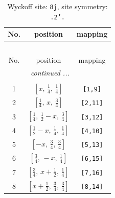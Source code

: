 \documentclass[fleqn,8pt]{jsarticle}
\begin{document}
\begin{longtable}{ccc}
\caption{Wyckoff site: {\tt 8j}, site symmetry: {\tt .2'.}}
 \\
 \hline \hline
No. & position & mapping \\ \hline \endfirsthead

\multicolumn{2}{l}{\tablename\ \thetable{}} \\
 \hline \hline
No. & position & mapping \\ \hline \endhead

 \hline \hline
\multicolumn{2}{r}{\footnotesize\it continued ...} \\ \endfoot

 \hline \hline
\multicolumn{2}{r}{} \\ \endlastfoot

1 & $\left[ x,\, \frac{1}{4},\, \frac{1}{4} \right]$ & {\tt [1,9]} \\ \hline
2 & $\left[ \frac{1}{4},\, x,\, \frac{3}{4} \right]$ & {\tt [2,11]} \\ \hline
3 & $\left[ \frac{1}{4},\, \frac{1}{2} - x,\, \frac{3}{4} \right]$ & {\tt [3,12]} \\ \hline
4 & $\left[ \frac{1}{2} - x,\, \frac{1}{4},\, \frac{1}{4} \right]$ & {\tt [4,10]} \\ \hline
5 & $\left[ - x,\, \frac{3}{4},\, \frac{3}{4} \right]$ & {\tt [5,13]} \\ \hline
6 & $\left[ \frac{3}{4},\, - x,\, \frac{1}{4} \right]$ & {\tt [6,15]} \\ \hline
7 & $\left[ \frac{3}{4},\, x + \frac{1}{2},\, \frac{1}{4} \right]$ & {\tt [7,16]} \\ \hline
8 & $\left[ x + \frac{1}{2},\, \frac{3}{4},\, \frac{3}{4} \right]$ & {\tt [8,14]} \\
\end{longtable}
\renewcommand{\arraystretch}{1.2}
\end{document}
